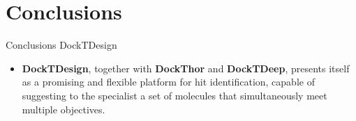 \documentclass[aspectratio=169,xcolor=dvipsnames]{beamer}
\begin{document}



\section{Conclusions}


\begin{frame}{Conclusions \hfill {\footnotesize \alert{DockTDesign}}}

    \begin{itemize}




        \item \textbf{DockTDesign}, together with \textbf{DockThor} and \textbf{DockTDeep}, presents itself as a promising and flexible platform for hit identification, capable of suggesting to the specialist a set of molecules that simultaneously meet multiple objectives.

    \end{itemize}

\end{frame}
\end{document}
